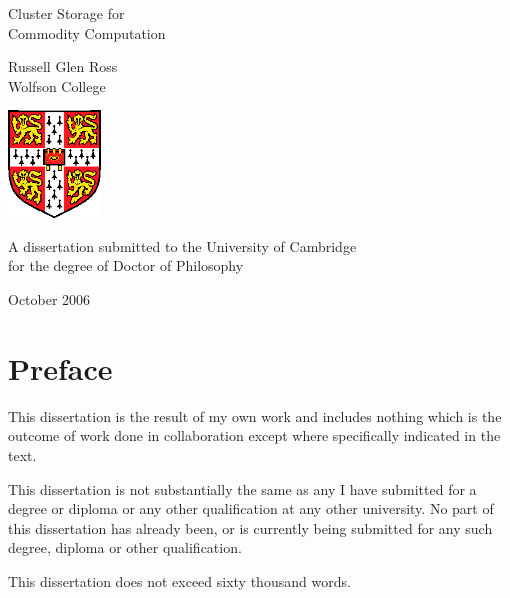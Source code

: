 
\pagestyle{empty}
\begin{titlepage}
\begin{center}
\vspace*{\fill}

\huge
Cluster Storage for\\ Commodity Computation

\vfill
\vfill

\huge
Russell Glen Ross\\[6mm]
\large
Wolfson College

\vfill
\includegraphics[width=70pt]{eps/camshield}
\vfill

\large
A dissertation submitted to the University of Cambridge\\
for the degree of Doctor of Philosophy

\vfill

October 2006

\vspace*{\fill}
\end{center}
\end{titlepage}
\cleardoublepage



\chapter*{Preface}

{
\parskip 10pt

\noindent This dissertation is the result of my own work and includes nothing which is the outcome of work done in collaboration except where specifically indicated in the text.

\noindent This dissertation is not substantially the same as any I have submitted for a degree or diploma or any other qualification at any other university. No part of this dissertation has already been, or is currently being submitted for any such degree, diploma or other qualification.

\noindent This dissertation does not exceed sixty thousand words.
}
\vfill

